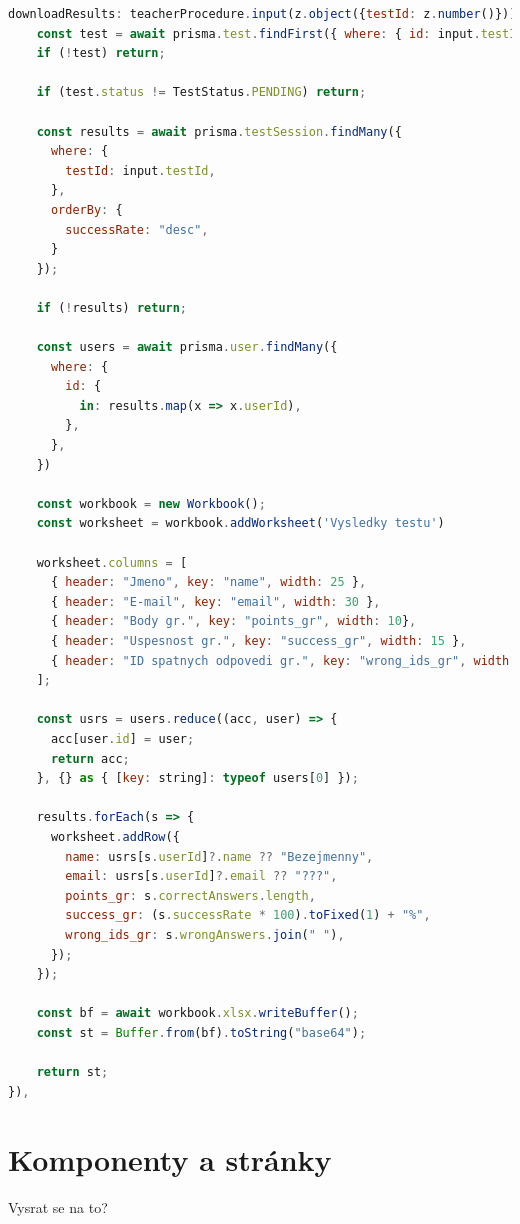 \begin{lstlisting}[language=JavaScript,caption={Endpoint downloadResults}]
downloadResults: teacherProcedure.input(z.object({testId: z.number()})).mutation(async ({ input }) => {
    const test = await prisma.test.findFirst({ where: { id: input.testId }});
    if (!test) return;
    
    if (test.status != TestStatus.PENDING) return;

    const results = await prisma.testSession.findMany({
      where: {
        testId: input.testId,
      }, 
      orderBy: {
        successRate: "desc",
      }
    });

    if (!results) return;

    const users = await prisma.user.findMany({
      where: {
        id: {
          in: results.map(x => x.userId),
        }, 
      },
    })

    const workbook = new Workbook();
    const worksheet = workbook.addWorksheet('Vysledky testu')

    worksheet.columns = [
      { header: "Jmeno", key: "name", width: 25 },
      { header: "E-mail", key: "email", width: 30 },
      { header: "Body gr.", key: "points_gr", width: 10},
      { header: "Uspesnost gr.", key: "success_gr", width: 15 },
      { header: "ID spatnych odpovedi gr.", key: "wrong_ids_gr", width: 40 },
    ];

    const usrs = users.reduce((acc, user) => {
      acc[user.id] = user;
      return acc;
    }, {} as { [key: string]: typeof users[0] });

    results.forEach(s => {
      worksheet.addRow({
        name: usrs[s.userId]?.name ?? "Bezejmenny",
        email: usrs[s.userId]?.email ?? "???",
        points_gr: s.correctAnswers.length,
        success_gr: (s.successRate * 100).toFixed(1) + "%",
        wrong_ids_gr: s.wrongAnswers.join(" "),
      });
    });

    const bf = await workbook.xlsx.writeBuffer();
    const st = Buffer.from(bf).toString("base64");

    return st;
}),
\end{lstlisting}

\section{Komponenty a stránky}

Vysrat se na to?
